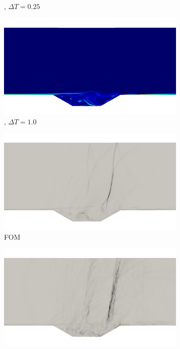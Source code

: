 \begin{figure}
\begin{center}
\begin{subfigure}[t]{0.49\textwidth}
\caption{\methodAcronym, $\Delta T = 0.25$}
\end{subfigure}
\begin{subfigure}[t]{0.49\textwidth}
\includegraphics[trim={10cm 3cm 10cm 12cm},clip,width=1.0\linewidth]{figs/cavity_new/vort_wls_numStepsInWindow_20_t50.png}
\caption{\methodAcronym, $\Delta T = 1.0$}
\end{subfigure}
\begin{subfigure}[t]{0.49\textwidth}
\includegraphics[trim={10cm 3cm 10cm 12cm},clip,width=1.0\linewidth]{figs/cavity_new/dens_fom_t50.png}
\caption{FOM}
\end{subfigure}
\begin{subfigure}[t]{0.49\textwidth}
\includegraphics[trim={10cm 3cm 10cm 12cm},clip,width=1.0\linewidth]{figs/cavity_new/dens_wls_numStepsInWindow_1_t50.png}

\end{subfigure}
\end{center}
\end{figure}
